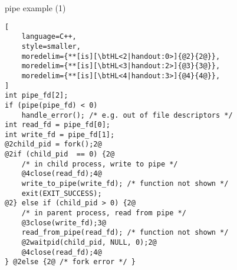 \begin{frame}[fragile,label=pipeExample]{pipe example (1)}
\begin{lstlisting}[
    language=C++,
    style=smaller,
    moredelim={**[is][\btHL<2|handout:0>]{@2}{2@}},
    moredelim={**[is][\btHL<3|handout:2>]{@3}{3@}},
    moredelim={**[is][\btHL<4|handout:3>]{@4}{4@}},
]
int pipe_fd[2];
if (pipe(pipe_fd) < 0)
    handle_error(); /* e.g. out of file descriptors */
int read_fd = pipe_fd[0];
int write_fd = pipe_fd[1];
@2child_pid = fork();2@
@2if (child_pid  == 0) {2@
    /* in child process, write to pipe */
    @4close(read_fd);4@
    write_to_pipe(write_fd); /* function not shown */
    exit(EXIT_SUCCESS);
@2} else if (child_pid > 0) {2@
    /* in parent process, read from pipe */
    @3close(write_fd);3@
    read_from_pipe(read_fd); /* function not shown */
    @2waitpid(child_pid, NULL, 0);2@
    @4close(read_fd);4@
} @2else {2@ /* fork error */ }
\end{lstlisting}
\end{frame}
